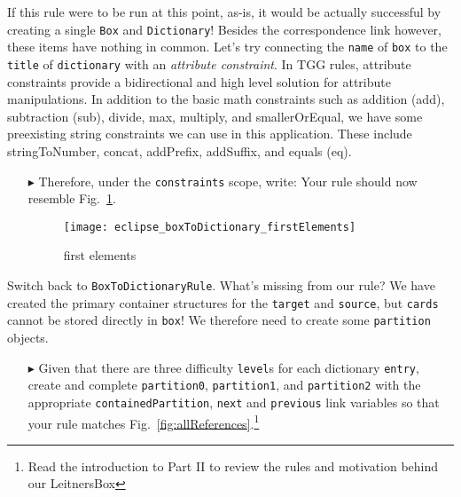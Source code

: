 If this rule were to be run at this point, as-is, it would be actually successful by creating a single \texttt{Box} and \texttt{Dictionary}! Besides the
correspondence link however, these items have nothing in common. Let's try connecting the \texttt{name} of \texttt{box} to the \texttt{title} of \texttt{dictionary} with an
\emph{attribute constraint}. In TGG rules, attribute constraints provide a bidirectional and high level solution for attribute manipulations. In addition to the
basic math constraints such as addition (add), subtraction (sub), divide, max, multiply, and smallerOrEqual, we have some preexisting string constraints
we can use in this application. These include stringToNumber, concat, addPrefix, addSuffix, and equals (eq).

\begin{itemize}

\item[$\blacktriangleright$] Therefore, under the \texttt{constraints} scope, write:
Your rule should now resemble Fig.~\ref{fig:ruleBasic}.

\vspace{0.5cm}

\begin{figure}[htbp]
\begin{center}
  \texttt{[image: eclipse\_boxToDictionary\_firstElements]}
  \caption{first elements}
  \label{fig:ruleBasic}
\end{center}
\end{figure}

\end{itemize}

Switch back to \texttt{BoxToDictionaryRule}. What's missing from our rule? We have created the primary container structures for the \texttt{target} and
\texttt{source}, but \texttt{cards} cannot be stored directly in \texttt{box}! We therefore need to create some \texttt{partition} objects. 

\begin{itemize}

\item[$\blacktriangleright$] Given that there are three difficulty \texttt{level}s for each dictionary \texttt{entry}, create and complete \texttt{partition0},
\texttt{partition1}, and \texttt{partition2} with the appropriate \texttt{containedPartition}, \texttt{next} and \texttt{previous} link variables so that your
rule matches Fig.~\ref{fig:allReferences}.\footnote{Read the introduction to Part II to review the rules and motivation behind our LeitnersBox}

\end{itemize}


